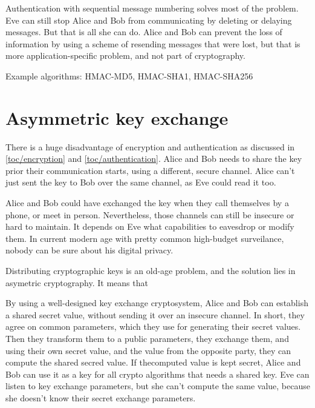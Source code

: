 Authentication with sequential message numbering solves most of the problem. Eve can still stop Alice and Bob from communicating by deleting or delaying messages. But that is all she can do. Alice and Bob can prevent the loss of information by using a scheme of resending messages that were lost, but that is more application-specific problem, and not part of cryptography.

Example algorithms: HMAC-MD5, HMAC-SHA1, HMAC-SHA256





\section{Asymmetric key exchange}

There is a huge disadvantage of encryption and authentication as discussed in \autoref{toc/encryption} and \autoref{toc/authentication}. Alice and Bob needs to share the key prior their communication starts, using a different, secure channel. Alice can't just sent the key to Bob over the same channel, as Eve could read it too.

Alice and Bob could have exchanged the key when they call themselves by a phone, or meet in person. Nevertheless, those channels can still be insecure or hard to maintain. It depends on Eve what capabilities to eavesdrop or modify them. In current modern age with pretty common high-budget surveilance, nobody can be sure about his digital privacy.

Distributing cryptographic keys is an old-age problem, and the solution lies in asymetric cryptography. It means that

By using a well-designed key exchange cryptosystem, Alice and Bob can establish a shared secret value, without sending it over an insecure channel. In short, they agree on common parameters, which they use for generating their secret values. Then they transform them to a public parameters, they exchange them, and using their own secret value, and the value from the opposite party, they can compute the shared secred value. If thecomputed value is kept secret, Alice and Bob can use it as a key for all crypto algorithms that needs a shared key. Eve can listen to key exchange parameters, but she can't compute the same value, because she doesn't know their secret exchange parameters.



